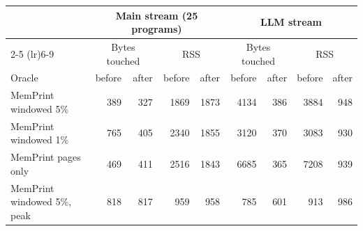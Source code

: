 \begin{tabular}{lrrrrrrrr}
\toprule
 & \multicolumn{4}{c}{Main stream (25 programs)} & \multicolumn{4}{c}{LLM stream} \\
\cmidrule(lr){2-5} \cmidrule(lr){6-9}
 & \multicolumn{2}{c}{Bytes touched} & \multicolumn{2}{c}{RSS} & \multicolumn{2}{c}{Bytes touched} & \multicolumn{2}{c}{RSS} \\
Oracle & before & after & before & after & before & after & before & after \\
\midrule
MemPrint windowed 5\% & 389 & 327 & 1869 & 1873 & 4134 & 386 & 3884 & 948 \\
MemPrint windowed 1\% & 765 & 405 & 2340 & 1855 & 3120 & 370 & 3083 & 930 \\
MemPrint pages only & 469 & 411 & 2516 & 1843 & 6685 & 365 & 7208 & 939 \\
MemPrint windowed 5\%, peak & 818 & 817 & 959 & 958 & 785 & 601 & 913 & 986 \\
\bottomrule
\end{tabular}
